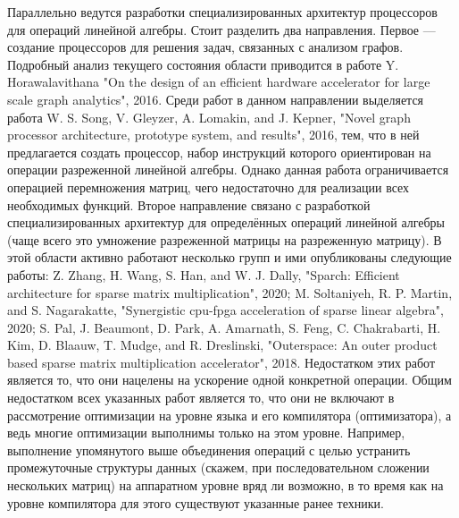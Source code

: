 \documentclass[12pt]{article}  %
\theoremstyle{remark}
\begin{document}
Параллельно ведутся разработки специализированных архитектур процессоров для операций линейной алгебры. Стоит разделить два направления. Первое --- создание процессоров для решения задач, связанных с анализом графов. Подробный анализ текущего состояния области приводится в работе Y. Horawalavithana "On the design of an efficient hardware accelerator for large scale graph analytics", 2016. Среди работ в данном направлении выделяется работа W. S. Song, V. Gleyzer, A. Lomakin, and J. Kepner, "Novel graph processor architecture, prototype system, and results", 2016, тем, что в ней предлагается создать процессор, набор инструкций которого ориентирован на операции разреженной линейной алгебры. Однако данная работа ограничивается операцией перемножения матриц, чего недостаточно для реализации всех необходимых функций. Второе направление связано с разработкой специализированных архитектур для определённых операций линейной алгебры (чаще всего это умножение разреженной матрицы на разреженную матрицу). В этой области активно работают несколько групп и ими опубликованы следующие работы: Z. Zhang, H. Wang, S. Han, and W. J. Dally, "Sparch: Efficient architecture for sparse matrix multiplication", 2020; M. Soltaniyeh, R. P. Martin, and S. Nagarakatte, "Synergistic cpu-fpga acceleration of sparse linear algebra", 2020; S. Pal, J. Beaumont, D. Park, A. Amarnath, S. Feng, C. Chakrabarti, H. Kim, D. Blaauw, T. Mudge, and R. Dreslinski, "Outerspace: An outer product based sparse matrix multiplication accelerator", 2018. Недостатком этих работ является то, что они нацелены на ускорение одной конкретной операции. Общим недостатком всех указанных работ является то, что они не включают в рассмотрение оптимизации на уровне языка и его компилятора (оптимизатора), а ведь многие оптимизации выполнимы только на этом уровне. Например, выполнение упомянутого выше объединения операций с целью устранить промежуточные структуры данных (скажем, при последовательном сложении нескольких матриц) на аппаратном уровне вряд ли возможно, в то время как на уровне компилятора для этого существуют указанные ранее техники.
\end{document}
